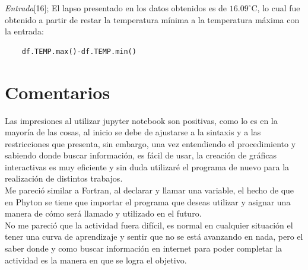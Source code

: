 \documentclass[11pt, spanish]{report}
\begin{document}
\emph{Entrada}[16]; El lapso presentado en los datos obtenidos es de $16.09^\circ$C, lo cual fue obtenido a partir de restar la temperatura mínima a la temperatura máxima con la entrada:
\begin{verbatim}
    df.TEMP.max()-df.TEMP.min()
\end{verbatim}

\section{Comentarios}
Las impresiones al utilizar jupyter notebook son positivas, como lo es en la mayoría de las cosas, al inicio se debe de ajustarse a la sintaxis y a las restricciones que presenta, sin embargo, una vez entendiendo el procedimiento y sabiendo donde buscar información, es fácil de usar, la creación de gráficas interactivas es muy eficiente y sin duda utilizaré el programa de nuevo para la realización de distintos trabajos.
\\
Me pareció similar a Fortran, al declarar y llamar una variable, el hecho de que en Phyton se tiene que importar el programa que deseas utilizar y asignar una manera de cómo será llamado y utilizado en el futuro.
\\
No me pareció que la actividad fuera difícil, es normal en cualquier situación el tener una curva de aprendizaje y sentir que no se está avanzando en nada, pero el saber donde y como buscar información en internet para poder completar la actividad es la manera en que se logra el objetivo.
\end{document}
